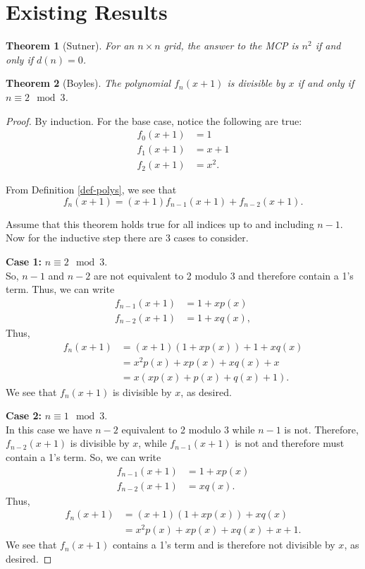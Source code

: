 \documentclass[a4paper]{article}
\newtheorem{theorem}{Theorem}
\begin{document}
	\section{Existing Results}
	\begin{theorem}[Sutner]
		For an $n \times n$ grid, the answer to the MCP is $n^2$ if and only if $d(n) = 0$.
	\end{theorem}

	\begin{theorem}[Boyles]\label{thm-polys-div-x}
		The polynomial $f_n(x+1)$ is divisible by $x$ if and only if $n \equiv 2 \mod 3$. 
	\end{theorem}
	\begin{proof}
		By induction.
		For the base case, notice the following are true:
		\begin{align*}
			f_0(x+1) &= 1 \\
			f_1(x+1) &= x+1 \\
			f_2(x+1) &= x^2.
		\end{align*}
	
		From Definition \ref{def-polys}, we see that
		\begin{equation*}
			f_{n}(x+1) = (x+1)f_{n-1}(x+1) + f_{n-2}(x+1).
		\end{equation*}
	
		Assume that this theorem holds true for all indices up to and including $n-1$.
		Now for the inductive step there are 3 cases to consider.
		
		\textbf{Case 1: } $n \equiv 2 \mod 3$. \\
		So, $n-1$ and $n-2$ are not equivalent to 2 modulo 3 and therefore contain a 1's term.
		Thus, we can write
		\begin{align*}
			f_{n-1}(x+1) &= 1 + x p(x) \\
			f_{n-2}(x+1) &= 1 + x q(x),
		\end{align*}
		Thus,
		\begin{align*}
			f_{n}(x+1) &= (x + 1)(1 + x p(x)) + 1 + x q(x) \\
				&= x^2 p(x) + x p(x) + x q(x) + x \\
				&= x(x p(x) + p(x) + q(x) + 1).
		\end{align*}
		We see that $f_n(x+1)$ is divisible by $x$, as desired.
		
		\textbf{Case 2: } $n \equiv 1 \mod 3$. \\
		In this case we have $n-2$ equivalent to 2 modulo 3 while $n-1$ is not.
		Therefore, $f_{n-2}(x+1)$ is divisible by $x$, while $f_{n-1}(x+1)$ is not and therefore must contain a 1's term.
		So, we can write
		\begin{align*}
			f_{n-1}(x+1) &= 1 + x p(x) \\
			f_{n-2}(x+1) &= x q(x).
		\end{align*}
		Thus,
		\begin{align*}
			f_n(x+1) &= (x+1)(1 + xp(x)) + xq(x) \\
				&= x^2 p(x) + xp(x) + xq(x) + x + 1.
		\end{align*}
		We see that $f_n(x+1)$ contains a 1's term and is therefore not divisible by $x$, as desired.
		

\end{proof}
\end{document}
